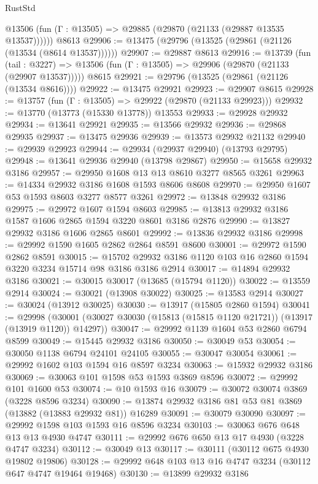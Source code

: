 \begin{lexlean}{RustStd}
\begin{coremodule}
      @13506 (fun (Γ : @13505) => @29885 (@29870 (@21133 (@29887 @13535 @13537))))))
    @8613
@29906 := @13475 (@29796 (@13525 (@29861 (@21126 (@13534 (@8614 @13537))))))
@29907 := @29887 @8613
@29916 := @13739
    (fun (tail : @3227) => @13506 (fun (Γ : @13505) => @29906 (@29870 (@21133 (@29907 @13537)))))
    @8615
@29921 := @29796 (@13525 (@29861 (@21126 (@13534 @8616))))
@29922 := @13475 @29921
@29923 := @29907 @8615
@29928 := @13757 (fun (Γ : @13505) => @29922 (@29870 (@21133 @29923)))
@29932 := @13770 (@13773 (@15330 @13778)) @13553
@29933 := @29928 @29932
@29934 := @13641 @29921
@29935 := @13566 @29932
@29936 := @29868 @29935
@29937 := @13475 @29936
@29939 := @13573 @29932 @21132
@29940 := @29939 @29923
@29944 := @29934 (@29937 @29940) (@13793 @29795)
@29948 := @13641 @29936 @29940 (@13798 @29867)
@29950 := @15658 @29932 @3186
@29957 := @29950 @1608 @13 @13 @8610 @3277 @8565 @3261
@29963 := @14334 @29932 @3186 @1608 @1593 @8606 @8608
@29970 := @29950 @1607 @53 @1593 @8603 @3277 @8577 @3261
@29972 := @13848 @29932 @3186
@29975 := @29972 @1607 @1594 @8603
@29985 := @13813 @29932 @3186 @1587 @1606 @2865 @1594 @3220 @8601 @3186 @2876
@29990 := @13827 @29932 @3186 @1606 @2865 @8601
@29992 := @13836 @29932 @3186
@29998 := @29992 @1590 @1605 @2862 @2864 @8591 @8600
@30001 := @29972 @1590 @2862 @8591
@30015 := @15702 @29932 @3186 @1120 @103 @16 @2860 @1594 @3220 @3234 @15714 @98 @3186 @3186 @2914
@30017 := @14894 @29932 @3186
@30021 := @30015 @30017 (@13685 (@15794 @1120))
@30022 := @13559 @2914
@30024 := @30021 (@13908 @30022)
@30025 := @13583 @2914
@30027 := @30024 (@13912 @30025)
@30030 := @13917 (@15805 @2860 @1594)
@30041 := @29998
    (@30001 (@30027 @30030 (@15813 (@15815 @1120 @21721)) (@13917 (@13919 @1120)) @14297))
@30047 := @29992 @1139 @1604 @53 @2860 @6794 @8599
@30049 := @15445 @29932 @3186
@30050 := @30049 @53
@30054 := @30050 @1138 @6794 @24101 @24105
@30055 := @30047 @30054
@30061 := @29992 @1602 @103 @1594 @16 @8597 @3234
@30063 := @15932 @29932 @3186
@30069 := @30063 @101 @1598 @53 @1593 @3869 @8596
@30072 := @29992 @101 @1600 @53
@30074 := @10 @1593 @16
@30079 := @30072 @30074 @3869 (@3228 @8596 @3234)
@30090 := @13874 @29932 @3186 @81 @53 @81 @3869 (@13882 (@13883 @29932 @81)) @16289
@30091 := @30079 @30090
@30097 := @29992 @1598 @103 @1593 @16 @8596 @3234
@30103 := @30063 @676 @648 @13 @13 @4930 @4747
@30111 := @29992 @676 @650 @13 @17 @4930 (@3228 @4747 @3234)
@30112 := @30049 @13
@30117 := @30111 (@30112 @675 @4930 @19802 @19806)
@30128 := @29992 @648 @103 @13 @16 @4747 @3234 (@30112 @647 @4747 @19464 @19468)
@30130 := @13899 @29932 @3186

\end{coremodule}
\end{lexlean}
